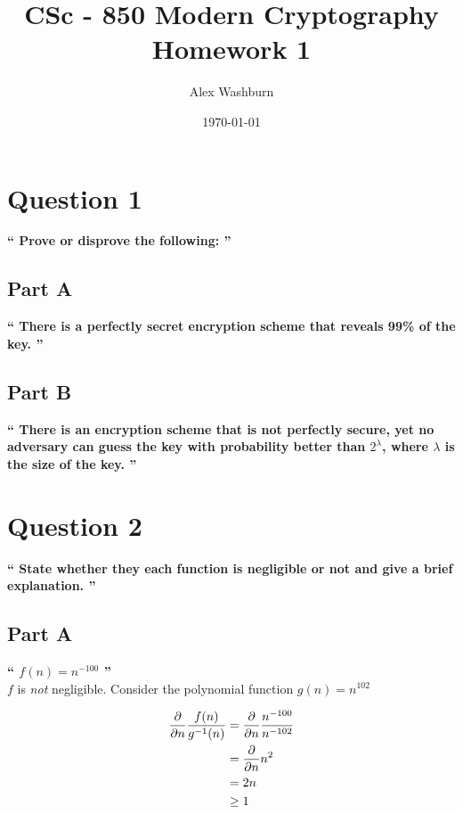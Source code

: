 \documentclass{article}
\title{CSc - 850 Modern Cryptography\\ Homework 1}
\author{Alex Washburn}
\date\today
\newcommand{\HomeworkText}[1]{\textbf{``#1''}\\}
\begin{document}

	\maketitle
	\vspace*{4cm}

	\restoregeometry
	
	\clearpage
	\section*{Question 1}
	\HomeworkText{
		Prove or disprove the following:
	}

	\subsection*{Part A}
	\HomeworkText{
		There is a perfectly secret encryption scheme that reveals 99\% of the key.
	}
	

	\subsection*{Part B}
	\HomeworkText{
		There is an encryption scheme that is not perfectly secure, yet no adversary can guess the key with probability better than $2^{\lambda}$, where $\lambda$ is the size of the key.
	}


	\clearpage
	\section*{Question 2}
	\HomeworkText{
		State whether they each function is negligible or not and give a brief explanation.
	}

	\subsection*{Part A}
	\HomeworkText{
		$f(n) = n^{-100}$
	}

	$f$ is \emph{not} negligible. Consider the polynomial function $g(n) = n^{102}$
	
	\begin{equation}
	\begin{split}
	\pdv{}{n} \frac{f(n)}{g^{-1}(n)} & = \pdv{}{n} \frac{n^{-100}}{n^{-102}} \\
	  & = \pdv{}{n} n^2 \\
	  & = 2n \\
	  & \ge 1
	\end{split}
	\end{equation}
	
\end{document}

